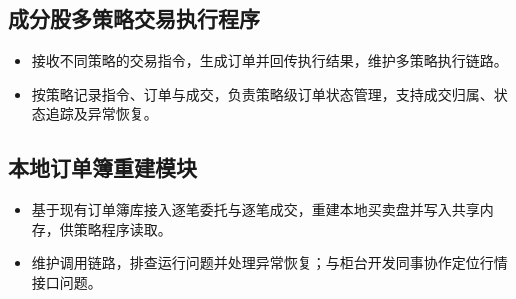 \documentclass{resume}
\begin{document}
\subsection{成分股多策略交易执行程序}
\begin{itemize}
  \item 接收不同策略的交易指令，生成订单并回传执行结果，维护多策略执行链路。
  \item 按策略记录指令、订单与成交，负责策略级订单状态管理，支持成交归属、状态追踪及异常恢复。
\end{itemize}

\subsection{本地订单簿重建模块}
\begin{itemize}
  \item 基于现有订单簿库接入逐笔委托与逐笔成交，重建本地买卖盘并写入共享内存，供策略程序读取。
  \item 维护调用链路，排查运行问题并处理异常恢复；与柜台开发同事协作定位行情接口问题。
\end{itemize}
\end{document}
